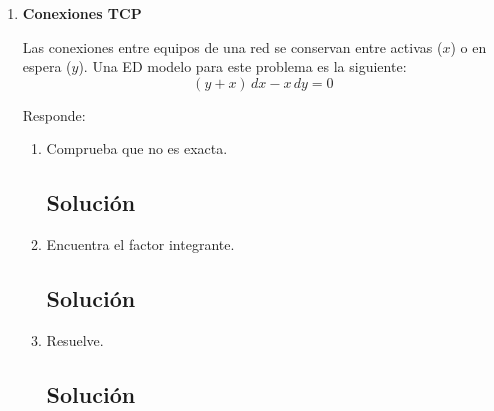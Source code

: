 \begin{enumerate}[label=\arabic*., leftmargin=*]
\begin{enumerate}[label=(\alph*), leftmargin=*]
        \item Muestra que un factor integrante es:
        \[ \mu(x,y) = \frac{1}{x^{2} + y^{2}} \]
        \textbf{NOTA:} SOLO DEBES MOSTRAR QUE ESTE FACTOR INTEGRANTE VUELVE LA EDO (1) EXACTA.
        \subsection*{Solución}
    \end{enumerate}

    \item \textbf{Conexiones TCP}

    Las conexiones entre equipos de una red se conservan entre activas ($x$) o en espera ($y$). Una ED modelo para este problema es la siguiente:
    \begin{equation*}
        (y + x)\,dx - x\,dy = 0 \tag{2}
    \end{equation*}

    Responde:
    \begin{enumerate}[label=(\alph*), leftmargin=*]
        \item Comprueba que no es exacta.
        \subsection*{Solución}

        \item Encuentra el factor integrante.
        \subsection*{Solución}

        \item Resuelve.
        \subsection*{Solución}
    \end{enumerate}
\end{enumerate}